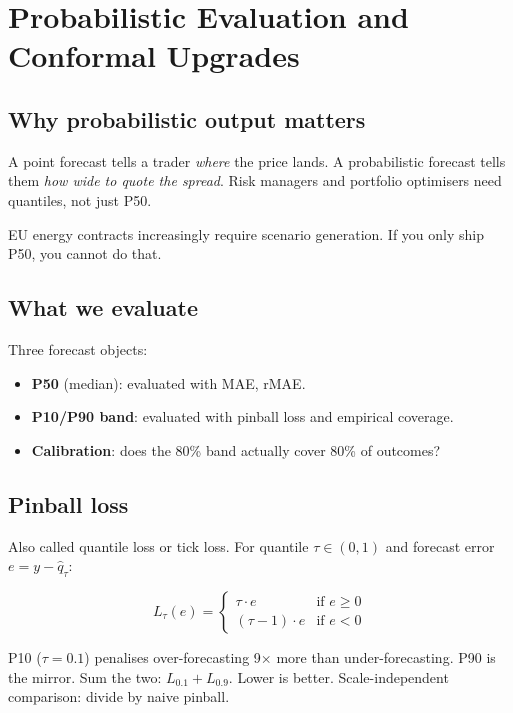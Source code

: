 \section{Probabilistic Evaluation and Conformal Upgrades}

\subsection{Why probabilistic output matters}

A point forecast tells a trader \emph{where} the price lands.
A probabilistic forecast tells them \emph{how wide to quote the spread}.
Risk managers and portfolio optimisers need quantiles, not just P50.

EU energy contracts increasingly require scenario generation.
If you only ship P50, you cannot do that.

\subsection{What we evaluate}

Three forecast objects:

\begin{itemize}
  \item \textbf{P50} (median): evaluated with MAE, rMAE.
  \item \textbf{P10/P90 band}: evaluated with pinball loss and empirical coverage.
  \item \textbf{Calibration}: does the 80\% band actually cover 80\% of outcomes?
\end{itemize}

\subsection{Pinball loss}

Also called quantile loss or tick loss.
For quantile $\tau \in (0,1)$ and forecast error $e = y - \hat{q}_\tau$:

\[
  L_\tau(e) =
  \begin{cases}
    \tau \cdot e      & \text{if } e \geq 0 \\
    (\tau - 1) \cdot e & \text{if } e < 0
  \end{cases}
\]

P10 ($\tau=0.1$) penalises over-forecasting 9$\times$ more than
under-forecasting. P90 is the mirror.
Sum the two: $L_{0.1} + L_{0.9}$. Lower is better.
Scale-independent comparison: divide by naive pinball.

